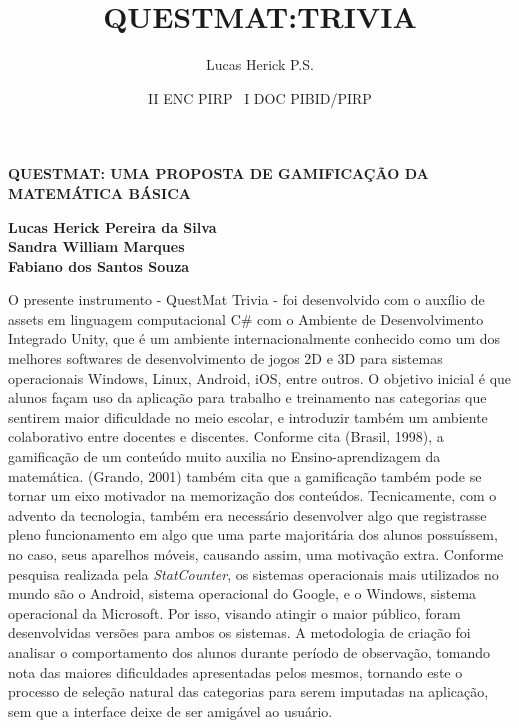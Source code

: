 \documentclass[12pt]{article}
\begin{document}
\author{Lucas Herick P.S.}
\title{QUESTMAT:TRIVIA}
\date{II ENC PIRP \ I DOC PIBID/PIRP}
	
\thispagestyle{empty}
\begin{center}
	{\large \textbf{ QUESTMAT: UMA PROPOSTA DE GAMIFICAÇÃO DA MATEMÁTICA BÁSICA}
}
\end{center}

\begin{flushright}
\textbf{	Lucas Herick Pereira da Silva\\
Sandra William Marques\\
Fabiano dos Santos Souza }
\end{flushright}


\noindent
O presente instrumento - QuestMat Trivia - foi desenvolvido com o auxílio de assets em linguagem computacional C\# com o Ambiente de Desenvolvimento Integrado Unity, que é um ambiente internacionalmente conhecido como um dos melhores softwares de desenvolvimento de jogos 2D e 3D para sistemas operacionais Windows, Linux, Android, iOS, entre outros. O objetivo inicial é que alunos façam uso da aplicação para trabalho e treinamento nas categorias que sentirem maior dificuldade no meio escolar, e introduzir também um ambiente colaborativo entre docentes e discentes. Conforme cita (Brasil, 1998), a gamificação de um conteúdo muito auxilia no Ensino-aprendizagem da matemática. (Grando, 2001) também cita que a gamificação também pode se tornar um eixo motivador na memorização dos conteúdos. Tecnicamente, com o advento da tecnologia, também era necessário desenvolver algo que registrasse pleno funcionamento em algo que uma parte majoritária dos alunos possuíssem, no caso, seus aparelhos móveis, causando assim, uma motivação extra. Conforme pesquisa realizada pela \textit{StatCounter}, os sistemas operacionais mais utilizados no mundo são o Android, sistema operacional do Google, e o Windows, sistema operacional da Microsoft. 
Por isso, visando atingir o maior público, foram desenvolvidas versões para ambos os sistemas.  A metodologia de criação foi analisar o comportamento dos alunos durante período de observação, tomando nota das maiores dificuldades apresentadas pelos mesmos, tornando este o processo de seleção natural das categorias para serem imputadas na aplicação, sem que a interface deixe de ser amigável ao usuário.     

\end{document}
